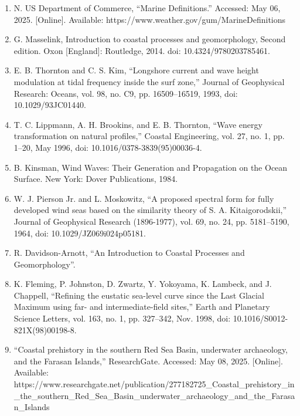 \documentclass{article}
\begin{document}
\begin{enumerate}
    \item{N. US Department of Commerce, “Marine Definitions.” Accessed: May 06, 2025. [Online]. Available: https://www.weather.gov/gum/MarineDefinitions}

    \item{G. Masselink, Introduction to coastal processes and geomorphology, Second edition. Oxon [England]: Routledge, 2014. doi: 10.4324/9780203785461.}

    \item{E. B. Thornton and C. S. Kim, “Longshore current and wave height modulation at tidal frequency inside the surf zone,” Journal of Geophysical Research: Oceans, vol. 98, no. C9, pp. 16509–16519, 1993, doi: 10.1029/93JC01440.}

    \item{T. C. Lippmann, A. H. Brookins, and E. B. Thornton, “Wave energy transformation on natural profiles,” Coastal Engineering, vol. 27, no. 1, pp. 1–20, May 1996, doi: 10.1016/0378-3839(95)00036-4.}

    \item{B. Kinsman, Wind Waves: Their Generation and Propagation on the Ocean Surface. New York: Dover Publications, 1984.}

    \item{W. J. Pierson Jr. and L. Moskowitz, “A proposed spectral form for fully developed wind seas based on the similarity theory of S. A. Kitaigorodskii,” Journal of Geophysical Research (1896-1977), vol. 69, no. 24, pp. 5181–5190, 1964, doi: 10.1029/JZ069i024p05181.}

    \item{R. Davidson-Arnott, “An Introduction to Coastal Processes and Geomorphology”.}

    \item{K. Fleming, P. Johnston, D. Zwartz, Y. Yokoyama, K. Lambeck, and J. Chappell, “Refining the eustatic sea-level curve since the Last Glacial Maximum using far- and intermediate-field sites,” Earth and Planetary Science Letters, vol. 163, no. 1, pp. 327–342, Nov. 1998, doi: 10.1016/S0012-821X(98)00198-8.}

     \item{“Coastal prehistory in the southern Red Sea Basin, underwater archaeology, and the Farasan Islands,” ResearchGate. Accessed: May 08, 2025. [Online]. Available: https://www.researchgate.net/publication/277182725_Coastal_prehistory_in_the_southern_Red_Sea_Basin_underwater_archaeology_and_the_Farasan_Islands}


\end{enumerate}
\end{document}
